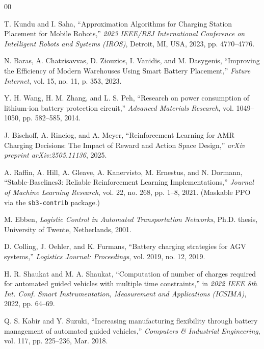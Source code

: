 \documentclass[conference]{IEEEtran}
\begin{document}
\begin{thebibliography}{00}

T. Kundu and I. Saha, ``Approximation Algorithms for Charging Station Placement for Mobile Robots,'' \emph{2023 IEEE/RSJ International Conference on Intelligent Robots and Systems (IROS)}, Detroit, MI, USA, 2023, pp. 4770--4776.

N. Baras, A. Chatzisavvas, D. Ziouzios, I. Vanidis, and M. Dasygenis, ``Improving the Efficiency of Modern Warehouses Using Smart Battery Placement,'' \emph{Future Internet}, vol. 15, no. 11, p. 353, 2023.

Y. H. Wang, H. M. Zhang, and L. S. Peh, ``Research on power consumption of lithium-ion battery protection circuit,'' \emph{Advanced Materials Research}, vol. 1049--1050, pp. 582--585, 2014.

J. Bischoff, A. Rinciog, and A. Meyer, ``Reinforcement Learning for AMR Charging Decisions: The Impact of Reward and Action Space Design,'' \emph{arXiv preprint arXiv:2505.11136}, 2025.

A. Raffin, A. Hill, A. Gleave, A. Kanervisto, M. Ernestus, and N. Dormann, ``Stable-Baselines3: Reliable Reinforcement Learning Implementations,'' \emph{Journal of Machine Learning Research}, vol. 22, no. 268, pp. 1--8, 2021. (Maskable PPO via the \texttt{sb3-contrib} package.)

M. Ebben, \emph{Logistic Control in Automated Transportation Networks}, Ph.D. thesis, University of Twente, Netherlands, 2001.

D. Colling, J. Oehler, and K. Furmans, ``Battery charging strategies for AGV systems,'' \emph{Logistics Journal: Proceedings}, vol. 2019, no. 12, 2019.

H. R. Shaukat and M. A. Shaukat, ``Computation of number of charges required for automated guided vehicles with multiple time constraints,'' in \emph{2022 IEEE 8th Int. Conf. Smart Instrumentation, Measurement and Applications (ICSIMA)}, 2022, pp. 64--69.

Q. S. Kabir and Y. Suzuki, ``Increasing manufacturing flexibility through battery management of automated guided vehicles,'' \emph{Computers \& Industrial Engineering}, vol. 117, pp. 225--236, Mar. 2018.


\end{thebibliography}
\end{document}
